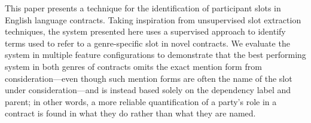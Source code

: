 This paper presents a technique for the identification of participant slots in English language contracts. Taking inspiration from unsupervised slot extraction techniques, the system presented here uses a supervised approach to identify terms used to refer to a genre-specific slot in novel contracts. We evaluate the system in multiple feature configurations to demonstrate that the best performing system in both genres of contracts omits the exact mention form from consideration---even though such mention forms are often the name of the slot under consideration---and is instead based solely on the dependency label and parent; in other words, a more reliable quantification of a party's role in a contract is found in what they do rather than what they are named.
